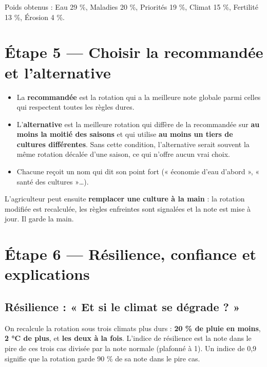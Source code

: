 \documentclass[11pt,a4paper]{article}
\begin{document}
\begin{exemple}
Poids obtenus : Eau 29 \%, Maladies 20 \%, Priorités 19 \%, Climat 15 \%, Fertilité 13 \%, Érosion 4 \%.
\end{exemple}

\section{Étape 5 — Choisir la recommandée et l'alternative}

\begin{itemize}
\item La \textbf{recommandée} est la rotation qui a la meilleure note globale parmi celles qui respectent toutes les règles dures.
\item L'\textbf{alternative} est la meilleure rotation qui diffère de la recommandée sur \textbf{au moins la moitié
des saisons} et qui utilise \textbf{au moins un tiers de cultures différentes}. Sans cette condition, l'alternative
serait souvent la même rotation décalée d'une saison, ce qui n'offre aucun vrai choix.
\item Chacune reçoit un nom qui dit son point fort (« économie d'eau d'abord », « santé des cultures »…).
\end{itemize}

L'agriculteur peut ensuite \textbf{remplacer une culture à la main} : la rotation modifiée est recalculée, les
règles enfreintes sont signalées et la note est mise à jour. Il garde la main.

\section{Étape 6 — Résilience, confiance et explications}

\subsection{Résilience : « Et si le climat se dégrade ? »}
On recalcule la rotation sous trois climats plus durs : \textbf{20 \% de pluie en moins}, \textbf{2 °C de plus},
et \textbf{les deux à la fois}. L'indice de résilience est la note dans le pire de ces trois cas divisée par la
note normale (plafonné à 1). Un indice de 0,9 signifie que la rotation garde 90 \% de sa note dans le pire cas.
\end{document}
